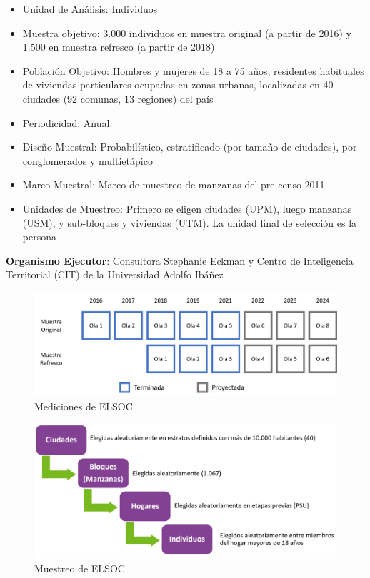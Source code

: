 \documentclass[
  12pt,
]{book}
\begin{document}
\begin{itemize}
\item
  Unidad de Análisis: Individuos
\item
  Muestra objetivo: 3.000 individuos en muestra original (a partir de 2016) y 1.500 en muestra refresco (a partir de 2018)
\item
  Población Objetivo: Hombres y mujeres de 18 a 75 años, residentes habituales de viviendas particulares ocupadas en zonas urbanas, localizadas en 40 ciudades (92 comunas, 13 regiones) del país
\item
  Periodicidad: Anual.
\item
  Diseño Muestral: Probabilístico, estratificado (por tamaño de ciudades), por conglomerados y multietápico
\item
  Marco Muestral: Marco de muestreo de manzanas del pre-censo 2011
\item
  Unidades de Muestreo: Primero se eligen ciudades (UPM), luego manzanas (USM), y sub-bloques y viviendas (UTM). La unidad final de selección es la persona
\end{itemize}

\textbf{Organismo Ejecutor}: Consultora Stephanie Eckman y Centro de Inteligencia Territorial (CIT) de la Universidad Adolfo Ibáñez

\begin{figure}

{\centering \includegraphics[width=1\linewidth,height=1\textheight]{../inputs/imagenes/olas_elsoc} 

}

\caption{Mediciones de ELSOC}\label{fig:ilust-olas-elsoc}
\end{figure}

\begin{figure}

{\centering \includegraphics[width=1\linewidth,height=1\textheight]{../inputs/imagenes/etapas_seleccion} 

}

\caption{Muestreo de ELSOC}\label{fig:ilust-etapas-seleccion}
\end{figure}
\end{document}

